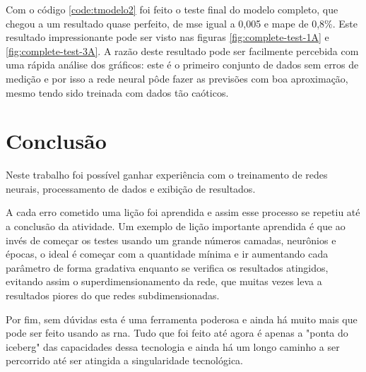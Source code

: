 \documentclass[12pt]{article}
\begin{document}
Com o código \ref{code:tmodelo2} foi feito o teste final do modelo completo, que chegou a um resultado quase perfeito, de \acrshort{mse} igual a 0,005 e \acrshort{mape} de 0,8\%. Este resultado impressionante pode ser visto nas figuras \ref{fig:complete-test-1A} e \ref{fig:complete-test-3A}.
A razão deste resultado pode ser facilmente percebida com uma rápida análise dos gráficos: este é o primeiro conjunto de dados sem erros de medição e por isso a rede neural pôde fazer as previsões com boa aproximação, mesmo tendo sido treinada com dados tão caóticos.

\section{Conclusão}

Neste trabalho foi possível ganhar experiência com o treinamento de redes neurais, processamento de dados e exibição de resultados.

A cada erro cometido uma lição foi aprendida e assim esse processo se repetiu até a conclusão da atividade.
Um exemplo de lição importante aprendida é que ao invés de começar os testes usando um grande números camadas, neurônios e épocas, o ideal é começar com a quantidade mínima e ir aumentando cada parâmetro de forma gradativa enquanto se verifica os resultados atingidos, evitando assim o superdimensionamento da rede, que muitas vezes leva a resultados piores do que redes subdimensionadas.

Por fim, sem dúvidas esta é uma ferramenta poderosa e ainda há muito mais que pode ser feito usando as \acrlong{rna}. Tudo que foi feito até agora é apenas a "ponta do iceberg" das capacidades dessa tecnologia e ainda há um longo caminho a ser percorrido até ser atingida a singularidade tecnológica.

\printglossary[type=\acronymtype]
\printglossary
\end{document}
